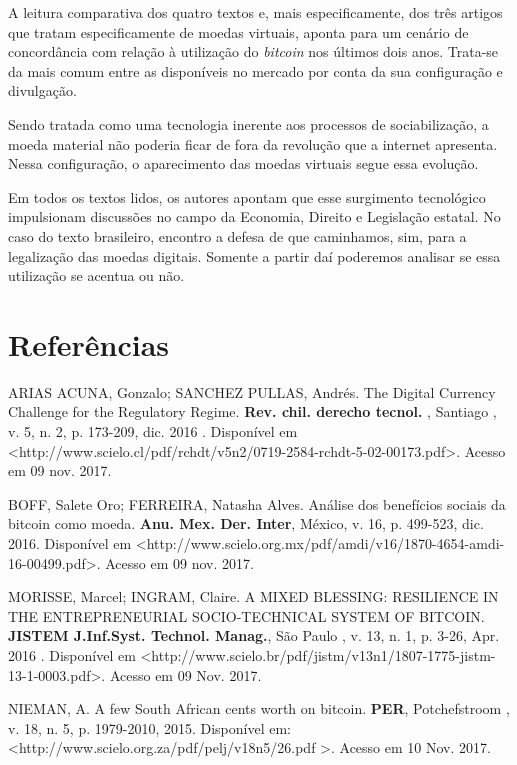 \documentclass[12pt]{article}
\begin{document}
A leitura comparativa dos quatro textos e, mais especificamente, dos três artigos que tratam especificamente de moedas virtuais, aponta para um cenário de concordância com relação à utilização do \textit{bitcoin} nos últimos dois anos. Trata-se da mais comum entre as disponíveis no mercado por conta da sua configuração e divulgação.

Sendo tratada como uma tecnologia inerente aos processos de sociabilização, a moeda material não poderia ficar de fora da revolução que a internet apresenta. Nessa configuração, o aparecimento das moedas virtuais segue essa evolução.

Em todos os textos lidos, os autores apontam que esse surgimento tecnológico impulsionam discussões no campo da Economia, Direito e Legislação estatal. No caso do texto brasileiro, encontro a defesa de que caminhamos, sim, para a legalização das moedas digitais. Somente a partir daí poderemos analisar se essa utilização se acentua ou não.

\section{Referências}

ARIAS ACUNA, Gonzalo; SANCHEZ PULLAS, Andrés. The Digital Currency Challenge for the Regulatory Regime. \textbf{Rev. chil. derecho tecnol.}  , Santiago , v. 5, n. 2, p. 173-209, dic. 2016 . Disponível em \textless http://www.scielo.cl/pdf/rchdt/v5n2/0719-2584-rchdt-5-02-00173.pdf\textgreater. Acesso em 09 nov. 2017.

\noindent BOFF, Salete Oro; FERREIRA, Natasha Alves. Análise dos benefícios sociais da bitcoin como moeda. \textbf{Anu. Mex. Der. Inter}, México, v. 16, p. 499-523, dic. 2016. Disponível em \textless http://www.scielo.org.mx/pdf/amdi/v16/1870-4654-amdi-16-00499.pdf\textgreater. Acesso em 09 nov. 2017.

\noindent MORISSE, Marcel; INGRAM, Claire. A MIXED BLESSING: RESILIENCE IN THE ENTREPRENEURIAL SOCIO-TECHNICAL SYSTEM OF BITCOIN. \textbf{ JISTEM J.Inf.Syst. Technol. Manag.},  São Paulo ,  v. 13, n. 1, p. 3-26,  Apr.  2016 .   Disponível em \textless http://www.scielo.br/pdf/jistm/v13n1/1807-1775-jistm-13-1-0003.pdf\textgreater. Acesso em  09  Nov.  2017.

\noindent NIEMAN, A. A few South African cents worth on bitcoin. \textbf{PER}, Potchefstroom ,  v. 18, n. 5, p. 1979-2010, 2015.   Disponível em: \textless http://www.scielo.org.za/pdf/pelj/v18n5/26.pdf \textgreater. Acesso em  10  Nov.  2017.
\end{document}
